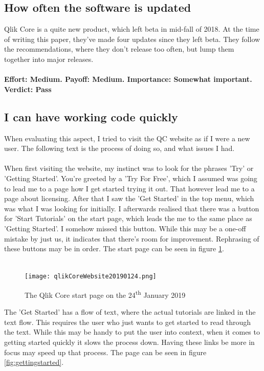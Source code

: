 \documentclass{cslthse-msc}
\begin{document}
    \subsection{How often the software is updated}
    Qlik Core is a quite new product, which left beta in mid-fall of 2018. At the time of writing this paper, they've made four updates since they left beta. They follow the recommendations, where they don't release too often, but lump them together into major releases.\\ \\
    \textbf{Effort: Medium. Payoff: Medium. Importance: Somewhat important.}\\
    \textbf{Verdict: Pass}
    \subsection{I can have working code quickly}\label{workincode}
    When evaluating this aspect, I tried to visit the QC website as if I were a new user. The following text is the process of doing so, and what issues I had.\\ \\
    When first visiting the website, my instinct was to look for the phrases 'Try' or 'Getting Started'. You're greeted by a 'Try For Free', which I assumed was going to lead me to a page how I get started trying it out. That however lead me to a page about licensing. After that I saw the 'Get Started' in the top menu, which was what I was looking for initially. I afterwards realised that there was a button for 'Start Tutorials' on the start page, which leads the me to the same place as 'Getting Started'. I somehow missed this button. While this may be a one-off mistake by just us, it indicates that there's room for improvement. Rephrasing of these buttons may be in order. The start page can be seen in figure \ref{fig:startpage}. \\ \\
    \begin{figure}[H]
        \centering
        \texttt{[image: qlikCoreWebsite20190124.png]}
        \caption{The Qlik Core start page on the 24\textsuperscript{th} January 2019}
        \label{fig:startpage}
    \end{figure}
    The 'Get Started' has a flow of text, where the actual tutorials are linked in the text flow. This requires the user who just wants to get started to read through the text. While this may be handy to put the user into context, when it comes to getting started quickly it slows the process down. Having these links be more in focus may speed up that process. The page can be seen in figure \ref{fig:gettingstarted}.
\end{document}
